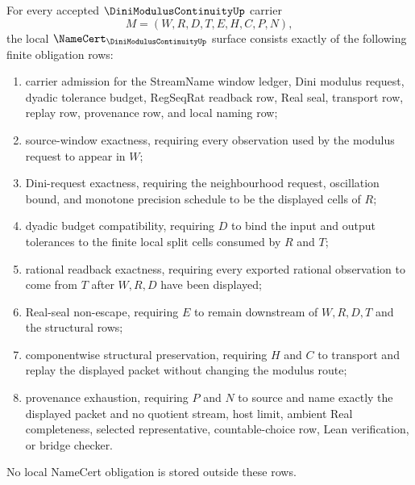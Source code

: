 \begin{theorem}\label{thm:dini-modulus-continuity-namecert-obligations}
For every accepted $\DiniModulusContinuityUp$ carrier
$$
M=(W,R,D,T,E,H,C,P,N),
$$
the local $\NameCert_{\DiniModulusContinuityUp}$ surface consists exactly of the following finite obligation rows:
\begin{enumerate}
\item carrier admission for the StreamName window ledger, Dini modulus request, dyadic tolerance budget, RegSeqRat readback row, Real seal, transport row, replay row, provenance row, and local naming row;
\item source-window exactness, requiring every observation used by the modulus request to appear in $W$;
\item Dini-request exactness, requiring the neighbourhood request, oscillation bound, and monotone precision schedule to be the displayed cells of $R$;
\item dyadic budget compatibility, requiring $D$ to bind the input and output tolerances to the finite local split cells consumed by $R$ and $T$;
\item rational readback exactness, requiring every exported rational observation to come from $T$ after $W,R,D$ have been displayed;
\item Real-seal non-escape, requiring $E$ to remain downstream of $W,R,D,T$ and the structural rows;
\item componentwise structural preservation, requiring $H$ and $C$ to transport and replay the displayed packet without changing the modulus route;
\item provenance exhaustion, requiring $P$ and $N$ to source and name exactly the displayed packet and no quotient stream, host limit, ambient Real completeness, selected representative, countable-choice row, Lean verification, or bridge checker.
\end{enumerate}
No local NameCert obligation is stored outside these rows.
\end{theorem}
